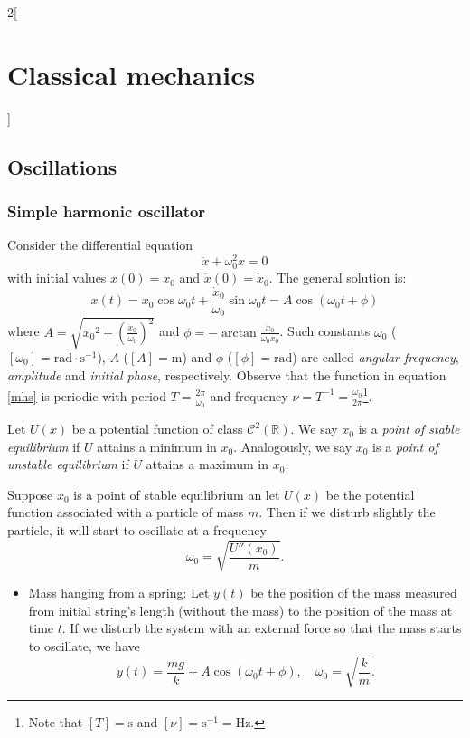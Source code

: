 \documentclass[../../../main.tex]{subfiles}
\begin{document}
\begin{multicols}{2}[\section{Classical mechanics}]
  \subsection{Oscillations}
  \subsubsection{Simple harmonic oscillator}
  \begin{prop}
    Consider the differential equation $$\ddot{x}+\omega_0^2 x=0$$ with initial values $x(0)=x_0$ and $\dot{x}(0)=\dot{x}_0$. The general solution is:
    \begin{equation}
      x(t)=x_0\cos\omega_0t+\frac{\dot{x}_0}{\omega_0}\sin\omega_0t=A\cos(\omega_0t+\phi)
      \label{mhs}
    \end{equation} where $\displaystyle A=\sqrt{{x_0}^2+{\left(\frac{\dot{x}_0}{\omega_0}\right)}^2}$ and $\displaystyle \phi=-\arctan\frac{\dot{x}_0}{\omega_0x_0}$. Such constants $\omega_0$ ($[\omega_0]=\text{rad}\cdot \text{s}^{-1}$), $A$ ($[A]=\text{m}$) and $\phi$ ($[\phi]=\text{rad}$) are called \textit{angular frequency}, \textit{amplitude} and \textit{initial phase}, respectively. Observe that the function in equation \eqref{mhs} is periodic with period $T=\frac{2\pi}{\omega_0}$ and frequency $\nu=T^{-1}=\frac{\omega_0}{2\pi}$\footnote{Note that $[T]=\text{s}$ and $[\nu]=\text{s}^{-1}=\text{Hz}$.}.
  \end{prop}
  \begin{definition}
    Let $U(x)$ be a potential function of class $\mathcal{C}^2(\mathbb{R})$. We say $x_0$ is a \textit{point of stable equilibrium} if $U$ attains a minimum in $x_0$. Analogously, we say $x_0$ is a \textit{point of unstable equilibrium} if $U$ attains a maximum in $x_0$.
  \end{definition}
  \begin{prop}
    Suppose $x_0$ is a point of stable equilibrium an let $U(x)$ be the potential function associated with a particle of mass $m$. Then if we disturb slightly the particle, it will start to oscillate at a frequency $$\omega_0=\sqrt{\frac{U''(x_0)}{m}}.$$
  \end{prop}
  \begin{prop}[Examples]
    \hfill
    \begin{itemize}
      \item Mass hanging from a spring: Let $y(t)$ be the position of the mass measured from initial string's length (without the mass) to the position of the mass at time $t$. If we disturb the system with an external force so that the mass starts to oscillate, we have $$y(t)=\frac{mg}{k}+A\cos(\omega_0t+\phi),\quad\omega_0=\sqrt{\frac{k}{m}}.$$

\end{itemize}
\end{prop}
\end{multicols}
\end{document}
